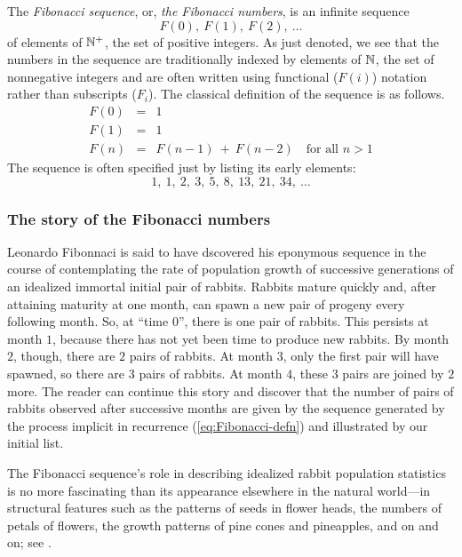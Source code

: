 The {\it Fibonacci sequence}, or, {\it the Fibonacci numbers}, is an
infinite sequence
\[ F(0), \ F(1), \ F(2), \ \ldots \]
of elements of $\mathbb{N}^+$, the set of positive integers.  As just denoted,
we see that the numbers in the sequence are traditionally indexed by
elements of $\mathbb{N}$, the set of nonnegative integers and are often
written using functional ($F(i)$) notation rather than subscripts
($F_i$).  The classical definition of the sequence is as follows.
\begin{eqnarray}
\nonumber
F(0) & = & 1 \\
\label{eq:Fibonacci-defn}
F(1) & = & 1 \\
\nonumber
F(n) & = & F(n-1) \ + \ F(n-2) \ \ \ \mbox{ for all } n > 1
\end{eqnarray}
The sequence is often specified just by listing its early elements:
\[ 1, \ 1, \ 2, \ 3, \ 5, \ 8, \ 13, \ 21, \ 34, \ \ldots \]


\subsubsection{The story of the Fibonacci numbers}
\label{sec:Fibonacci-story}

Leonardo Fibonnaci is said to have dscovered his eponymous sequence in
the course of contemplating the rate of population growth of
successive generations of an idealized immortal initial pair of
rabbits.  Rabbits mature quickly and, after attaining maturity at one
month, can spawn a new pair of progeny every following month.  So, at
``time $0$'', there is one pair of rabbits.  This persists at month
$1$, because there has not yet been time to produce new rabbits.  By
month $2$, though, there are $2$ pairs of rabbits.  At month $3$, only
the first pair will have spawned, so there are $3$ pairs of rabbits.
At month $4$, these $3$ pairs are joined by $2$ more.  The reader can
continue this story and discover that the number of pairs of rabbits
observed after successive months are given by the sequence generated
by the process implicit in recurrence (\ref{eq:Fibonacci-defn}) and
illustrated by our initial list.

The Fibonacci sequence's role in describing idealized rabbit
population statistics is no more fascinating than its appearance
elsewhere in the natural world---in structural features such as the
patterns of seeds in flower heads, the numbers of petals of flowers,
the growth patterns of pine cones and pineapples, and on and on; see
\cite{Basin63}.

